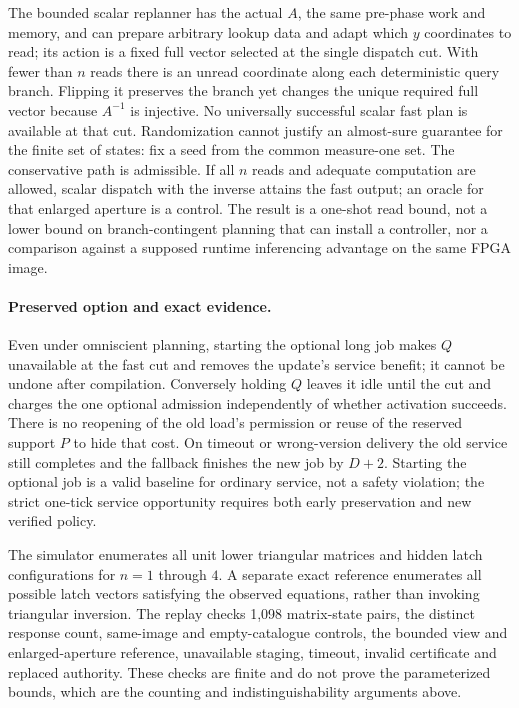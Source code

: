 \documentclass[11pt]{article}
\begin{document}
The bounded scalar replanner has the actual $A$, the same pre-phase work and memory, and can prepare arbitrary lookup data and adapt which $y$ coordinates to read; its action is a fixed full vector selected at the single dispatch cut. With fewer than $n$ reads there is an unread coordinate along each deterministic query branch. Flipping it preserves the branch yet changes the unique required full vector because $A^{-1}$ is injective. No universally successful scalar fast plan is available at that cut. Randomization cannot justify an almost-sure guarantee for the finite set of states: fix a seed from the common measure-one set. The conservative path is admissible. If all $n$ reads and adequate computation are allowed, scalar dispatch with the inverse attains the fast output; an oracle for that enlarged aperture is a control. The result is a one-shot read bound, not a lower bound on branch-contingent planning that can install a controller, nor a comparison against a supposed runtime inferencing advantage on the same FPGA image.

\paragraph{Preserved option and exact evidence.}
Even under omniscient planning, starting the optional long job makes $Q$ unavailable at the fast cut and removes the update's service benefit; it cannot be undone after compilation. Conversely holding $Q$ leaves it idle until the cut and charges the one optional admission independently of whether activation succeeds. There is no reopening of the old load's permission or reuse of the reserved support $P$ to hide that cost. On timeout or wrong-version delivery the old service still completes and the fallback finishes the new job by $D+2$. Starting the optional job is a valid baseline for ordinary service, not a safety violation; the strict one-tick service opportunity requires both early preservation and new verified policy.

The simulator enumerates all unit lower triangular matrices and hidden latch configurations for $n=1$ through $4$. A separate exact reference enumerates all possible latch vectors satisfying the observed equations, rather than invoking triangular inversion. The replay checks 1,098 matrix-state pairs, the distinct response count, same-image and empty-catalogue controls, the bounded view and enlarged-aperture reference, unavailable staging, timeout, invalid certificate and replaced authority. These checks are finite and do not prove the parameterized bounds, which are the counting and indistinguishability arguments above.
\end{document}
